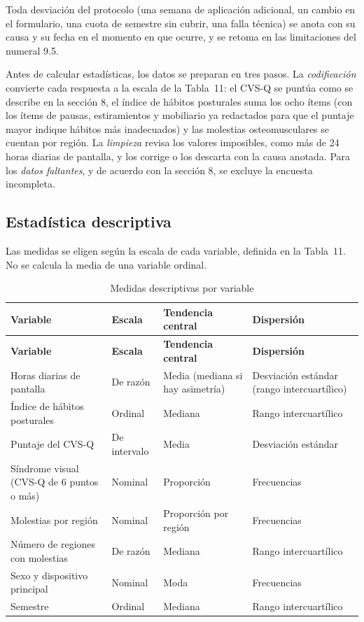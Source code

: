Toda desviación del protocolo (una semana de aplicación adicional, un cambio en el
formulario, una cuota de semestre sin cubrir, una falla técnica) se anota con su causa y
su fecha en el momento en que ocurre, y se retoma en las limitaciones del numeral 9.5.


Antes de calcular estadísticas, los datos se preparan en tres pasos. La
\emph{codificación} convierte cada respuesta a la escala de la Tabla~11: el CVS-Q se
puntúa como se describe en la sección 8, el índice de hábitos posturales suma los ocho
ítems (con los ítems de pausas, estiramientos y mobiliario ya redactados para que el
puntaje mayor indique hábitos más inadecuados) y las molestias osteomusculares se cuentan
por región. La \emph{limpieza} revisa los valores imposibles, como más de 24 horas diarias
de pantalla, y los corrige o los descarta con la causa anotada. Para los \emph{datos
faltantes}, y de acuerdo con la sección 8, se excluye la encuesta incompleta.

\subsection{Estadística descriptiva}

Las medidas se eligen según la escala de cada variable, definida en la Tabla~11. No se
calcula la media de una variable ordinal.

\bigskip
\begin{center}
\small
\begin{longtable}{L{4.4cm} L{3.4cm} L{3.4cm} L{3.2cm}}
\caption{Medidas descriptivas por variable}\label{tab:descriptivas} \\
\toprule
\textbf{Variable} & \textbf{Escala} & \textbf{Tendencia central} & \textbf{Dispersión} \\
\midrule
\endfirsthead
\toprule
\textbf{Variable} & \textbf{Escala} & \textbf{Tendencia central} & \textbf{Dispersión} \\
\midrule
\endhead
Horas diarias de pantalla & De razón & Media (mediana si hay asimetría) & Desviación estándar (rango intercuartílico) \\
\midrule
Índice de hábitos posturales & Ordinal & Mediana & Rango intercuartílico \\
\midrule
Puntaje del CVS-Q & De intervalo & Media & Desviación estándar \\
\midrule
Síndrome visual (CVS-Q de 6 puntos o más) & Nominal & Proporción & Frecuencias \\
\midrule
Molestias por región & Nominal & Proporción por región & Frecuencias \\
\midrule
Número de regiones con molestias & De razón & Mediana & Rango intercuartílico \\
\midrule
Sexo y dispositivo principal & Nominal & Moda & Frecuencias \\
\midrule
Semestre & Ordinal & Mediana & Rango intercuartílico \\
\bottomrule
\end{longtable}
\end{center}

